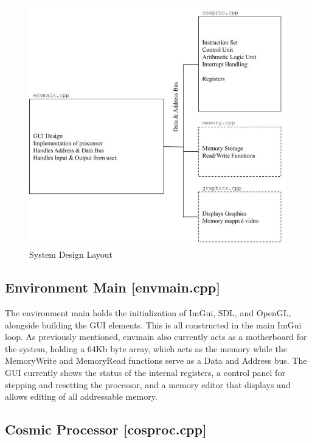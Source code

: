 \documentclass[conference]{IEEEtran}
\begin{document}
\begin{figure}[h!]
	\includegraphics[width=\linewidth]{SystemDesign.jpg}
	\caption{System Design Layout}
	\label{fig:System Design Layout}
\end{figure}



\subsection{Environment Main [envmain.cpp]}

The environment main holds the initialization of ImGui, SDL, and OpenGL, alongside building the GUI elements. This is all constructed in the main ImGui loop. As previously mentioned, envmain also currently acts as a motherboard for the system, holding a 64Kb byte array, which acts as the memory while the MemoryWrite and MemoryRead functions serve as a Data and Address bus. The GUI currently shows the status of the internal registers, a control panel for stepping and resetting the processor, and a memory editor that displays and allows editing of all addressable memory. 


\subsection{Cosmic Processor [cosproc.cpp]}
\end{document}
